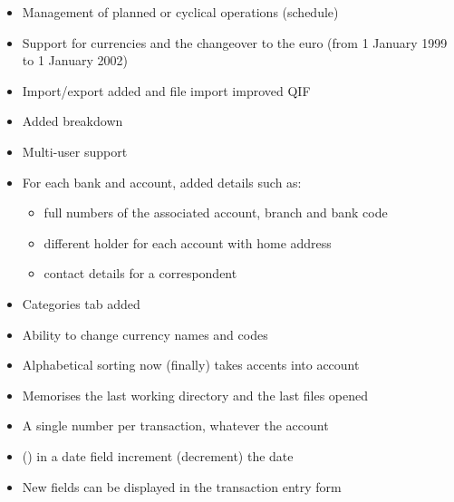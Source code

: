 \begin{itemize}
	\item Management of planned or cyclical operations (schedule)%
	\item Support for currencies and the changeover to the euro (from 1 January 1999 to 1 January 2002)%
	\item Import/export added and file import improved \gls{QIF}%
	\item Added breakdown%
	\item Multi-user support%
	\item For each bank and account, added details such as:%
		\begin{itemize}
			\item[\textopenbullet] full numbers of the associated account, branch and bank code%
			\item[\textopenbullet] different holder for each account with home address%
			\item[\textopenbullet] contact details for a correspondent%
		\end{itemize}
	\item Categories tab added%
	\item Ability to change currency names and codes%
	\item Alphabetical sorting now (finally) takes accents into account%
	\item Memorises the last working directory and the last files opened%
	\item A single number per transaction, whatever the account%
	\item \keys{{+}} (\keys{{-}}) in a date field increment (decrement) the date%
	\item New fields can be displayed in the transaction entry form%

\end{itemize}

